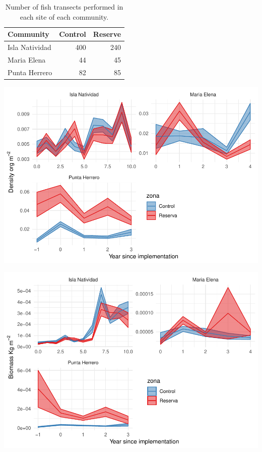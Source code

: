 \documentclass[]{article}
\begin{document}
\begin{table}

\caption{\label{tab:unnamed-chunk-5}Number of fish transects performed in each site of each community.}
\centering
\begin{tabular}[t]{l|r|r}
\hline
Community & Control & Reserve\\
\hline
Isla Natividad & 400 & 240\\
\hline
Maria Elena & 44 & 45\\
\hline
Punta Herrero & 82 & 85\\
\hline
\end{tabular}
\end{table}

\includegraphics{SupplementaryMaterial_files/figure-latex/unnamed-chunk-6-1.pdf}

\includegraphics{SupplementaryMaterial_files/figure-latex/unnamed-chunk-7-1.pdf}
\end{document}

